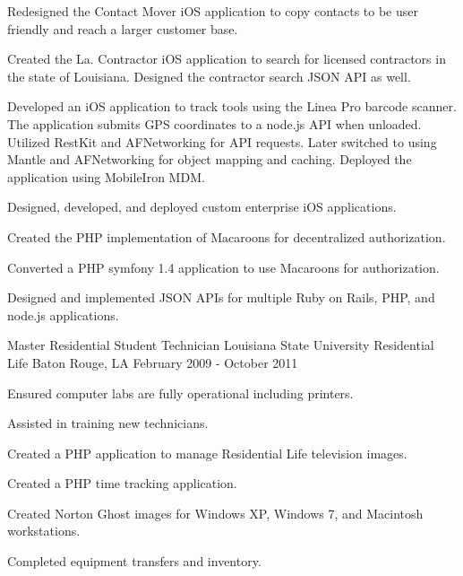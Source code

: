 \documentclass[]{awesome-cv}
\begin{document}
\begin{cventries}
{\begin{cvitems}
    \item {Redesigned the Contact Mover iOS application to copy contacts to be user friendly and reach a larger customer base.}
    \item {Created the La. Contractor iOS application to search for licensed contractors in the state of Louisiana. Designed the contractor search JSON API as well.}
    \item {Developed an iOS application to track tools using the Linea Pro barcode scanner. The application submits GPS coordinates to a node.js API when unloaded. Utilized RestKit and AFNetworking for API requests. Later switched to using Mantle and AFNetworking for object mapping and caching. Deployed the application using MobileIron MDM.}
    \item {Designed, developed, and deployed custom enterprise iOS applications.}
    \item {Created the PHP implementation of Macaroons for decentralized authorization.}
    \item {Converted a PHP symfony 1.4 application to use Macaroons for authorization.}
    \item {Designed and implemented JSON APIs for multiple Ruby on Rails, PHP, and node.js applications.}
    \end{cvitems}}
\cventry
	{Master Residential Student Technician}
	{Louisiana State University Residential Life}
	{Baton Rouge, LA}
	{February 2009 - October 2011}
	{\begin{cvitems}
    \item {Ensured computer labs are fully operational including printers.}
    \item {Assisted in training new technicians.}
    \item {Created a PHP application to manage Residential Life television images.}
    \item {Created a PHP time tracking application.}
    \item {Created Norton Ghost images for Windows XP, Windows 7, and Macintosh workstations.}
    \item {Completed equipment transfers and inventory.}
		\end{cvitems}}
\end{cventries}
\pagebreak
{}
\end{document}
